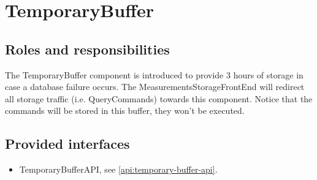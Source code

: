 \section{TemporaryBuffer}
\label{element:temporary-buffer}

\subsection{Roles and responsibilities}

\npar The TemporaryBuffer component is introduced to provide 3 hours of storage
in case a database failure occurs. The MeasurementsStorageFrontEnd will redirect
all storage traffic (i.e. QueryCommands) towards this component. Notice that the
commands will be stored in this buffer, they won't be executed.

\subsection{Provided interfaces}

\begin{itemize}
  \item TemporaryBufferAPI, see \ref{api:temporary-buffer-api}.
\end{itemize}